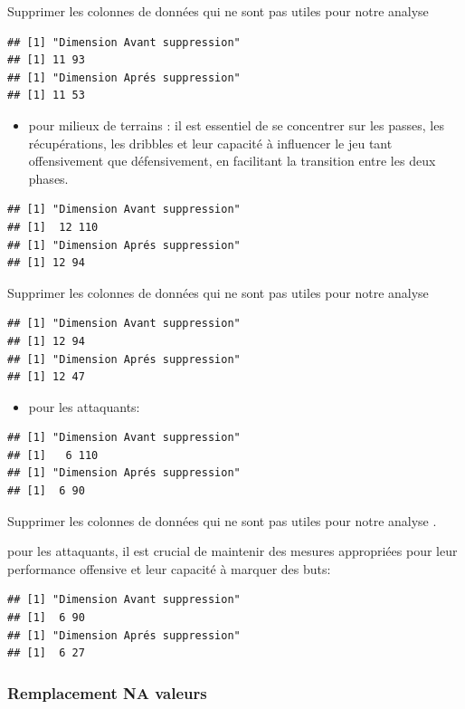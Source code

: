 \documentclass[
  6pt,
]{article}
\providecommand{\tightlist}{%
  \setlength{\itemsep}{0pt}\setlength{\parskip}{0pt}}
\begin{document}
Supprimer les colonnes de données qui ne sont pas utiles pour notre
analyse

\begin{verbatim}
## [1] "Dimension Avant suppression"
## [1] 11 93
## [1] "Dimension Aprés suppression"
## [1] 11 53
\end{verbatim}

\begin{itemize}
\tightlist
\item
  pour milieux de terrains : il est essentiel de se concentrer sur les
  passes, les récupérations, les dribbles et leur capacité à influencer
  le jeu tant offensivement que défensivement, en facilitant la
  transition entre les deux phases.
\end{itemize}

\begin{verbatim}
## [1] "Dimension Avant suppression"
## [1]  12 110
## [1] "Dimension Aprés suppression"
## [1] 12 94
\end{verbatim}

Supprimer les colonnes de données qui ne sont pas utiles pour notre
analyse

\begin{verbatim}
## [1] "Dimension Avant suppression"
## [1] 12 94
## [1] "Dimension Aprés suppression"
## [1] 12 47
\end{verbatim}

\begin{itemize}
\tightlist
\item
  pour les attaquants:
\end{itemize}

\begin{verbatim}
## [1] "Dimension Avant suppression"
## [1]   6 110
## [1] "Dimension Aprés suppression"
## [1]  6 90
\end{verbatim}

Supprimer les colonnes de données qui ne sont pas utiles pour notre
analyse .

pour les attaquants, il est crucial de maintenir des mesures appropriées
pour leur performance offensive et leur capacité à marquer des buts:

\begin{verbatim}
## [1] "Dimension Avant suppression"
## [1]  6 90
## [1] "Dimension Aprés suppression"
## [1]  6 27
\end{verbatim}

\subsubsection{Remplacement NA valeurs}\label{remplacement-na-valeurs}
\end{document}
